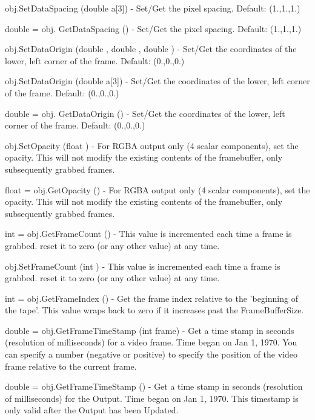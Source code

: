 \begin{DoxyItemize}
\item {\ttfamily obj.\-Set\-Data\-Spacing (double a\mbox{[}3\mbox{]})} -\/ Set/\-Get the pixel spacing. Default\-: (1.,1.,1.)  
\item {\ttfamily double = obj. Get\-Data\-Spacing ()} -\/ Set/\-Get the pixel spacing. Default\-: (1.,1.,1.)  
\item {\ttfamily obj.\-Set\-Data\-Origin (double , double , double )} -\/ Set/\-Get the coordinates of the lower, left corner of the frame. Default\-: (0.,0.,0.)  
\item {\ttfamily obj.\-Set\-Data\-Origin (double a\mbox{[}3\mbox{]})} -\/ Set/\-Get the coordinates of the lower, left corner of the frame. Default\-: (0.,0.,0.)  
\item {\ttfamily double = obj. Get\-Data\-Origin ()} -\/ Set/\-Get the coordinates of the lower, left corner of the frame. Default\-: (0.,0.,0.)  
\item {\ttfamily obj.\-Set\-Opacity (float )} -\/ For R\-G\-B\-A output only (4 scalar components), set the opacity. This will not modify the existing contents of the framebuffer, only subsequently grabbed frames.  
\item {\ttfamily float = obj.\-Get\-Opacity ()} -\/ For R\-G\-B\-A output only (4 scalar components), set the opacity. This will not modify the existing contents of the framebuffer, only subsequently grabbed frames.  
\item {\ttfamily int = obj.\-Get\-Frame\-Count ()} -\/ This value is incremented each time a frame is grabbed. reset it to zero (or any other value) at any time.  
\item {\ttfamily obj.\-Set\-Frame\-Count (int )} -\/ This value is incremented each time a frame is grabbed. reset it to zero (or any other value) at any time.  
\item {\ttfamily int = obj.\-Get\-Frame\-Index ()} -\/ Get the frame index relative to the 'beginning of the tape'. This value wraps back to zero if it increases past the Frame\-Buffer\-Size.  
\item {\ttfamily double = obj.\-Get\-Frame\-Time\-Stamp (int frame)} -\/ Get a time stamp in seconds (resolution of milliseconds) for a video frame. Time began on Jan 1, 1970. You can specify a number (negative or positive) to specify the position of the video frame relative to the current frame.  
\item {\ttfamily double = obj.\-Get\-Frame\-Time\-Stamp ()} -\/ Get a time stamp in seconds (resolution of milliseconds) for the Output. Time began on Jan 1, 1970. This timestamp is only valid after the Output has been Updated.  

\end{DoxyItemize}

